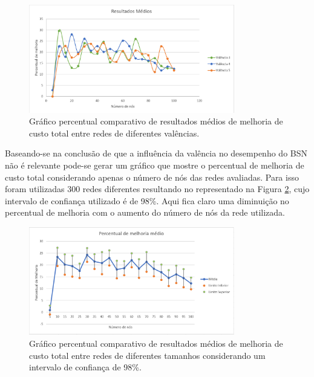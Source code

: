 \begin{figure} [ht]%
	\centering
	\includegraphics[width=0.8\textwidth]{./figuras/BSN-resultados-medios.png} %
	\caption[Melhoria de custo x valência]{Gráfico percentual comparativo de resultados médios de melhoria de custo total entre redes de diferentes valências.}
	\label{fig_graph_bsn_medio}
\end{figure}

Baseando-se na conclusão de que a influência da valência no desempenho do BSN não é relevante pode-se gerar um gráfico que mostre o percentual de melhoria de custo total considerando apenas o número de nós das redes avaliadas. Para isso foram utilizadas 300 redes diferentes resultando no representado na Figura \ref{fig_graph_bsn_medio_all}, cujo intervalo de confiança utilizado é de 98\%. Aqui fica claro uma diminuição no percentual de melhoria com o aumento do número de nós da rede utilizada. 

\begin{figure} [ht]%
	\centering
	\includegraphics[width=0.8\textwidth]{./figuras/BSN-resultados-medios-all2.png} %
	\caption[Melhoria de custo x tamanho de rede]{Gráfico percentual comparativo de resultados médios de melhoria de custo total entre redes de diferentes tamanhos considerando um intervalo de confiança de 98\%.}
	\label{fig_graph_bsn_medio_all}
\end{figure}

